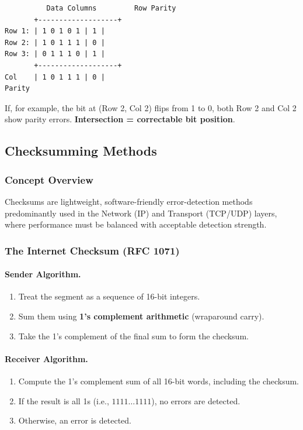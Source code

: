 \documentclass[12pt]{article}
\begin{document}
\begin{verbatim}
          Data Columns         Row Parity
       +-------------------+
Row 1: | 1 0 1 0 1 | 1 |
Row 2: | 1 0 1 1 1 | 0 |
Row 3: | 0 1 1 1 0 | 1 |
       +-------------------+
Col    | 1 0 1 1 1 | 0 |
Parity
\end{verbatim}

If, for example, the bit at (Row 2, Col 2) flips from 1 to 0, both Row 2 and Col 2 show parity errors.
\textbf{Intersection = correctable bit position}.

\subsection{Checksumming Methods}

\subsubsection{Concept Overview}

Checksums are lightweight, software-friendly error-detection methods predominantly used in the
Network (IP) and Transport (TCP/UDP) layers, where performance must be balanced with acceptable detection strength.

\subsubsection{The Internet Checksum (RFC 1071)}

\paragraph{Sender Algorithm.}
\begin{enumerate}
    \item Treat the segment as a sequence of 16-bit integers.
    \item Sum them using \textbf{1's complement arithmetic} (wraparound carry).
    \item Take the 1's complement of the final sum to form the checksum.
\end{enumerate}

\paragraph{Receiver Algorithm.}
\begin{enumerate}
    \item Compute the 1's complement sum of all 16-bit words, including the checksum.
    \item If the result is all 1s (i.e., $1111\ldots1111$), no errors are detected.
    \item Otherwise, an error is detected.
\end{enumerate}
\end{document}
